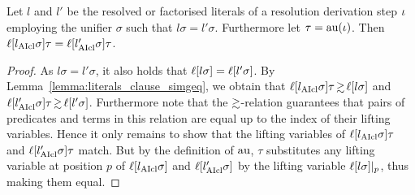 \documentclass[,%
	draft=false,%
	numbers=noendperiod
	11pt,
	a4paper,
	oneside,%
	openany,
]{memoir}
\begin{document}
\begin{lemma}
	\label{lemma:lifted_literal_equal}
	Let $l$ and $l'$ be the resolved or factorised literals of a resolution derivation step $\iota$ employing the unifier $\sigma$ such that $l\sigma = l'\sigma$.
	Furthermore let $\tau =\nolinebreak \aiu(\inference)$.
	Then $\ell[l_{\operatorname{AIcl}}\sigma]\tau = \ell[l_{\operatorname{AIcl}}'\sigma]\tau$.
\end{lemma}
\begin{proof}
	As 
	$l\sigma = l'\sigma$, it also holds that 
	$\ell[l\sigma] = \ell[l'\sigma]$.
	By Lemma~\ref{lemma:literals_clause_simgeq}, we obtain that 
	$\lifboth{l\cl\sigma}\tau \simgeq \lifboth{l\sigma}$ and
	$\lifboth{l'\cl\sigma}\tau \simgeq \lifboth{l'\sigma}$. 
	Furthermore note that the $\simgeq$-\nolinebreak{}relation guarantees that pairs of predicates and terms in this relation are equal up to the index of their lifting variables.
	Hence it only remains to show that the lifting variables of $\ell[l_{\operatorname{AIcl}}\sigma]\tau$ and $\ell[l'_{\operatorname{AIcl}}\sigma]\tau$ match.
	But by the definition of $\operatorname{au}$, $\tau$ substitutes any lifting variable at position $p$ of $\ell[l_{\operatorname{AIcl}}\sigma]$ and $\ell[l'_{\operatorname{AIcl}}\sigma]$ by the lifting variable $\ell[l\sigma]|_{p}$, 
	thus making them equal.
\end{proof}
\end{document}
